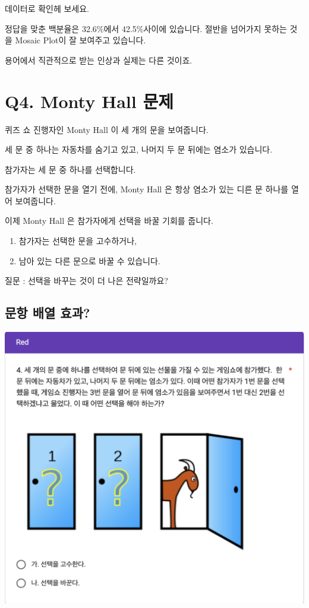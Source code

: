 \documentclass[
]{book}
\begin{document}
데이터로 확인헤 보세요.

정답을 맞춘 백분율은 32.6\%에서 42.5\%사이에 있습니다. 절반을 넘어가지 못하는 것을 Mosaic Plot이 잘 보여주고 있습니다.

용어에서 직관적으로 받는 인상과 실제는 다른 것이죠.

\section{Q4. Monty Hall 문제}\label{q4.-monty-hall-uxbb38uxc81c-1}

퀴즈 쇼 진행자인 Monty Hall 이 세 개의 문을 보여줍니다.

세 문 중 하나는 자동차를 숨기고 있고, 나머지 두 문 뒤에는 염소가 있습니다.

참가자는 세 문 중 하나를 선택합니다.

참가자가 선택한 문을 열기 전에, Monty Hall 은 항상 염소가 있는 디른 문 하나를 열어 보여줍니다.

이제 Monty Hall 은 참가자에게 선택을 바꿀 기회를 줍니다.

\begin{enumerate}
\def\labelenumi{\arabic{enumi}.}
\item
  참가자는 선택한 문을 고수하거나,
\item
  남아 있는 다른 문으로 바꿀 수 있습니다.
\end{enumerate}

질문 : 선택을 바꾸는 것이 더 나은 전략일까요?

\subsection{문항 배열 효과?}\label{uxbb38uxd56d-uxbc30uxc5f4-uxd6a8uxacfc-1}

\includegraphics[width=0.75\linewidth]{./pics/Quiz240524_Q4_Red}
\end{document}
